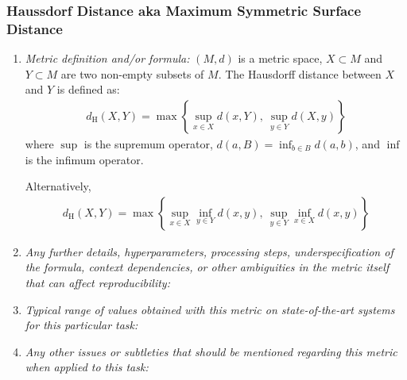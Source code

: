 \documentclass[a4paper,11pt]{article}
\begin{document}
        \subsubsection{Haussdorf Distance aka Maximum Symmetric Surface Distance}
            \begin{enumerate}[label=\alph*.]
                \item \textit{Metric definition and/or formula:}
                    $(M, d)$ is a metric space, $X \subset M$ and $Y \subset M$ are two non-empty subsets of $M$. The Hausdorff distance between $X$ and $Y$ is defined as:
                    \begin{align}
                        d_{\textrm{H}}\left(X, Y\right) = \max
                            \left\{
                                \sup_{x \in X} d\left(x, Y\right),\
                                \sup_{y \in Y} d\left(X, y\right)
                            \right\}
                    \end{align}
                    where $\sup$ is the supremum operator, $d(a, B) = \inf_{b \in B} d(a, b)$, and $\inf$ is the infimum operator.

                    Alternatively,
                    \begin{align}
                        d_{\textrm{H}}\left(X, Y\right) = \max
                            \left\{
                                \sup_{x \in X} \inf_{y \in Y} d(x, y),\ 
                                \sup_{y \in Y} \inf_{x \in X} d(x, y)
                            \right\}
                    \end{align}
                \bigskip
                \item \textit{Any further details, hyperparameters, processing steps, underspecification of the formula, context dependencies, or other ambiguities in the metric itself that can affect reproducibility:}
                \bigskip
                \item \textit{Typical range of values obtained with this metric on state-of-the-art systems for this particular task:}
                \bigskip
                \item \textit{Any other issues or subtleties that should be mentioned regarding this metric when applied to this task:}
                \bigskip
            \end{enumerate}
\end{document}
